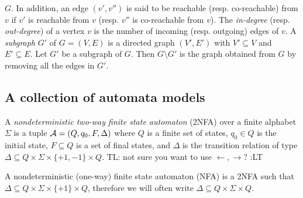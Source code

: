 \documentclass{llncs}
\newcommand{\tl}[1]{\color{blue} {TL: #1 :LT} \color{black}}
\newcommand{\tl}[1]{}
\begin{document}
$G$. In addition, an edge $(\mathit{v'},\mathit{v''})$ is said to be reachable
(resp. co-reachable) from $\mathit{v}$ if $\mathit{v'}$ is reachable from $\mathit{v}$ (resp. $\mathit{v''}$ is co-reachable from $\mathit{v}$). The \emph{in-degree} (resp. \emph{out-degree}) of a vertex $\mathit{v}$ is the number of incoming (resp. outgoing) edges of $\mathit{v}$.
A \emph{subgraph} $G'$ of $G=(V,E)$ is a directed graph $(V', E')$ with
$V' \subseteq V$ and $E' \subseteq E$. Let $G'$ be a subgraph of $G$. Then $G \setminus G'$ is the graph obtained from $G$ by removing all the edges in $G'$.

\subsection{A collection of automata models}

\begin{definition}
A \emph{nondeterministic two-way finite state automaton}
(2NFA) over a finite alphabet $\Sigma$ is a tuple $\mathcal{A} =
(Q, q_0, F, \Delta)$ where $Q$ is a finite set of states, $q_0\in Q$ is
the initial state, $F\subseteq Q$ is a set of final states, and $\Delta$ is the
transition relation  of type $\Delta\subseteq Q \times \Sigma\times \{+1, -1\}\times Q $.
\tl{not sure you want to use $\leftarrow, \rightarrow$?}

A nondeterministic (one-way) finite state automaton (NFA)
is a 2NFA such that $\Delta\subseteq Q \times \Sigma\times \{+1\} \times Q $, therefore we
will often write $\Delta\subseteq Q \times \Sigma \times Q$.
\end{definition}


\end{document}
